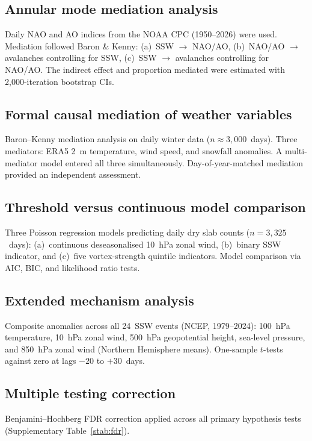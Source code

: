 \documentclass[11pt,letterpaper]{article}
\begin{document}
\subsection{Annular mode mediation analysis}

Daily NAO and AO indices from the NOAA CPC (1950--2026) were used. Mediation followed Baron \& Kenny: (a)~SSW $\to$ NAO/AO, (b)~NAO/AO $\to$ avalanches controlling for SSW, (c)~SSW $\to$ avalanches controlling for NAO/AO. The indirect effect and proportion mediated were estimated with 2,000-iteration bootstrap CIs.

\subsection{Formal causal mediation of weather variables}

Baron--Kenny mediation analysis on daily winter data ($n \approx 3{,}000$~days). Three mediators: ERA5 2~m temperature, wind speed, and snowfall anomalies. A multi-mediator model entered all three simultaneously. Day-of-year-matched mediation provided an independent assessment.

\subsection{Threshold versus continuous model comparison}

Three Poisson regression models predicting daily dry slab counts ($n = 3{,}325$~days): (a)~continuous deseasonalised 10~hPa zonal wind, (b)~binary SSW indicator, and (c)~five vortex-strength quintile indicators. Model comparison via AIC, BIC, and likelihood ratio tests.

\subsection{Extended mechanism analysis}

Composite anomalies across all 24~SSW events (NCEP, 1979--2024): 100~hPa temperature, 10~hPa zonal wind, 500~hPa geopotential height, sea-level pressure, and 850~hPa zonal wind (Northern Hemisphere means). One-sample $t$-tests against zero at lags $-20$ to $+30$~days.

\subsection{Multiple testing correction}

Benjamini--Hochberg FDR correction applied across all primary hypothesis tests (Supplementary Table~\ref{stab:fdr}).
\end{document}
